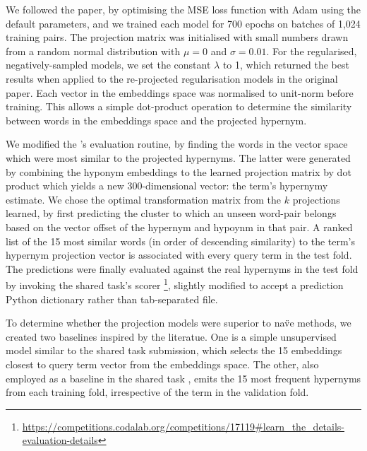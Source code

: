 We followed the paper, by optimising the MSE loss function with Adam \citep{kingma2014adam} using the default parameters, and we trained each model for 700 epochs on batches of 1,024 training pairs. The projection matrix was initialised with small numbers drawn from a random normal distribution with $\mu=0$ and $\sigma=0.01$.  For the regularised, negatively-sampled models, we set the constant $\lambda$ to 1, which returned the best results when applied to the re-projected regularisation models in the original paper.  Each vector in the embeddings space was normalised to unit-norm before training.  This allows a simple dot-product operation to determine the similarity between words in the embeddings space and the projected hypernym.

We modified the \citeauthor{ustalov2017negative}'s evaluation routine, by finding the words in the vector space which were most similar to the projected hypernyms.  The latter were generated by combining the hyponym embeddings to the learned projection matrix by dot product which yields a new 300-dimensional vector: the term's hypernymy estimate.  We chose the optimal transformation matrix from the $k$ projections learned, by first predicting the cluster to which an unseen word-pair belongs based on the vector offset of the hypernym and hypoynm in that pair.  A ranked list of the 15 most similar words (in order of descending similarity) to the term's hypernym projection vector is associated with every query term in the test fold.  The predictions were finally evaluated against the real hypernyms in the test fold by invoking the shared task's scorer \footnote{\url{https://competitions.codalab.org/competitions/17119\#learn_the_details-evaluation-details}}, slightly modified to accept a prediction Python dictionary rather than tab-separated file.  

To determine whether the projection models were superior to na\"ve methods, we created two baselines inspired by the literatue.  One is a simple unsupervised model similar to the \citep{maldonado2018adapt} shared task submission, which selects the 15 embeddings closest to query term vector from the embeddings space.  The other, also employed as a baseline in the shared task \citep{camacho2018semeval}, emits the 15 most frequent hypernyms from each training fold, irrespective of the term in the validation fold.  

